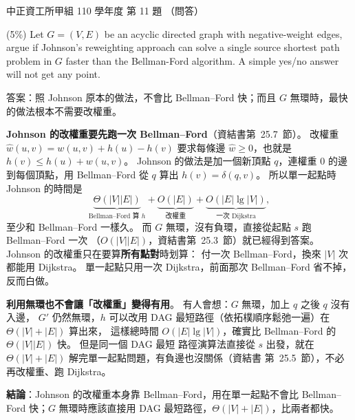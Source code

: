 \begin{pastexam}[label={px:ccu-110-swa-09}]{中正資工所甲組 110 學年度 第 11 題}
（問答）

(5\%) Let $G = (V, E)$ be an acyclic directed graph with negative-weight edges, argue if Johnson's
reweighting approach can solve a single source shortest path problem in $G$ faster than the
Bellman-Ford algorithm. A simple yes/no answer will not get any point.
\end{pastexam}

\begin{pastsoln}
答案：照 Johnson 原本的做法，不會比 Bellman--Ford 快；而且 $G$ 無環時，最快的做法根本不需要改權重。

\textbf{Johnson 的改權重要先跑一次 Bellman--Ford}（資結書第~25.7~節）。 改權重
$\hat{w}(u, v) = w(u, v) + h(u) - h(v)$ 要求每條邊 $\hat{w} \ge 0$，也就是 $h(v) \le h(u) + w(u, v)$。
Johnson 的做法是加一個新頂點 $q$，連權重 $0$ 的邊到每個頂點，用 Bellman--Ford 從 $q$ 算出
$h(v) = \delta(q, v)$。 所以單一起點時 Johnson 的時間是
\[
\underbrace{\Theta(|V||E|)}_{\text{Bellman--Ford 算 } h}
+ \underbrace{O(|E|)}_{\text{改權重}}
+ \underbrace{O(|E| \lg |V|)}_{\text{一次 Dijkstra}},
\]
至少和 Bellman--Ford 一樣久。 而 $G$ 無環，沒有負環，直接從起點 $s$ 跑 Bellman--Ford 一次
（$O(|V||E|)$，資結書第~25.3~節）就已經得到答案。 Johnson 的改權重只在要算\textbf{所有點對}時划算：
付一次 Bellman--Ford，換來 $|V|$ 次都能用 Dijkstra。 單一起點只用一次 Dijkstra，前面那次
Bellman--Ford 省不掉，反而白做。

\textbf{利用無環也不會讓「改權重」變得有用}。 有人會想：$G$ 無環，加上 $q$ 之後 $q$ 沒有入邊，
$G'$ 仍然無環，$h$ 可以改用 DAG 最短路徑（依拓樸順序鬆弛一遍）在 $\Theta(|V| + |E|)$ 算出來，
這樣總時間 $O(|E| \lg |V|)$，確實比 Bellman--Ford 的 $\Theta(|V||E|)$ 快。 但是同一個 DAG 最短
路徑演算法直接從 $s$ 出發，就在 $\Theta(|V| + |E|)$ 解完單一起點問題，有負邊也沒關係（資結書
第~25.5~節），不必再改權重、跑 Dijkstra。

\textbf{結論}：Johnson 的改權重本身靠 Bellman--Ford，用在單一起點不會比 Bellman--Ford 快；$G$
無環時應該直接用 DAG 最短路徑，$\Theta(|V| + |E|)$，比兩者都快。
\end{pastsoln}
